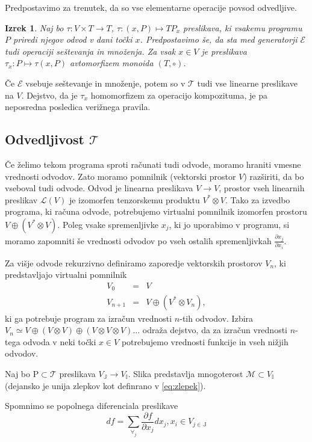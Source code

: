\documentclass{article}
\newcommand{\II}{\mathbb{I}}
\newcommand{\JJ}{\mathbb{J}}
\newcommand{\E}{\mathcal{E}}
\newcommand{\T}{\mathcal{T}}
\newtheorem{izrek}{Izrek}[section]
\begin{document}
Predpostavimo za trenutek, da so vse elementarne operacije povsod odvedljive. 

\begin{izrek}
  Naj bo $\tau:V\times T\to T$, $\tau:(x,P)\mapsto TP_x$ preslikava,  ki vsakemu programu
  $P$ priredi njegov odvod v dani točki $x$. Predpostavimo še, da sta med generatorji $\E$
  tudi operaciji seštevanja in množenja. Za vsak $x\in V$ je preslikava
  $\tau_x:P\mapsto \tau(x,P)$ avtomorfizem monoida $(T,\circ)$. 
\end{izrek}
Če $\E$ vsebuje seštevanje in množenje, potem so v $\T$ tudi vse linearne preslikave
na $V$. Dejstvo, da je $\tau_x$ homomorfizem za operacijo kompozituma, je pa 
neposredna posledica verižnega pravila.

\subsection{Odvedljivost $\T$}
Če želimo tekom programa sproti računati tudi odvode, moramo hraniti vmesne
vrednosti odvodov. Zato moramo pomnilnik (vektorski prostor $V$) razširiti, da
bo vseboval tudi odvode. Odvod je linearna preslikava $V\to V$, prostor
vseh linearnih preslikav $\mathcal{L}(V)$ je izomorfen tenzorskemu produktu
$V^*\otimes V$. Tako za izvedbo programa, ki računa odvode, potrebujemo virtualni
pomnilnik izomorfen prostoru $V\oplus (V^*\otimes V)$. Poleg vsake spremenljivke $x_j$, ki
jo uporabimo v programu, si moramo zapomniti še vrednosti odvodov po vseh
ostalih spremenljivkah $\frac{\partial x_j}{\partial x_i}$.   

Za višje odvode rekurzivno definiramo zaporedje vektorskih prostorov $V_n$, ki
predstavljajo virtualni pomnilnik
\begin{eqnarray}\label{eq:V_n}
  \label{eq:prapor}
  V_0 &=& V\\
  V_{n+1}&=&V\oplus (V^*\otimes V_n),
\end{eqnarray} 
ki ga potrebuje program za izračun vrednosti $n$-tih odvodov. Izbira $V_n\simeq
V\oplus (V\otimes V) \oplus (V\otimes V\otimes V) \ldots$ odraža dejstvo, da za izračun vrednosti $n$-tega odvoda v neki točki $x\in V$
potrebujemo vrednosti funkcije in vseh nižjih odvodov.

Naj bo $\mathrm{P}\subset\T$ preslikava $V_\JJ\to V_\II$. Slika predstavlja mnogoterost $\mathcal{M}\subset V_\II$ (dejansko je unija zlepkov kot definrano v \ref{eq:zlepek}).

Spomnimo se popolnega diferenciala preslikave
$$df=\sum_{\forall_j}\frac{\partial f}{\partial x_j}dx_j, x_i\in V_{j\in\JJ}$$
\end{document}
